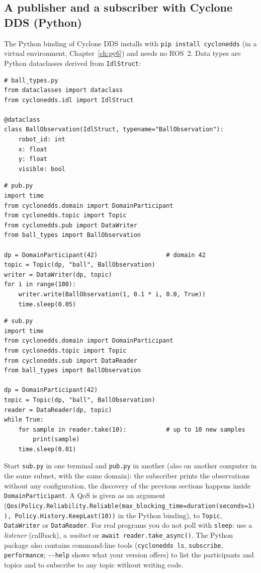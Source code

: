 \subsection*{A publisher and a subscriber with Cyclone DDS (Python)}
The Python binding of Cyclone DDS installs with \verb!pip install cyclonedds! (in a virtual environment, Chapter~\ref{ch:py6}) and needs no ROS~2. Data types are Python dataclasses derived from \verb!IdlStruct!:
\begin{verbatim}
# ball_types.py
from dataclasses import dataclass
from cyclonedds.idl import IdlStruct

@dataclass
class BallObservation(IdlStruct, typename="BallObservation"):
    robot_id: int
    x: float
    y: float
    visible: bool
\end{verbatim}
\begin{verbatim}
# pub.py
import time
from cyclonedds.domain import DomainParticipant
from cyclonedds.topic import Topic
from cyclonedds.pub import DataWriter
from ball_types import BallObservation

dp = DomainParticipant(42)                   # domain 42
topic = Topic(dp, "ball", BallObservation)
writer = DataWriter(dp, topic)
for i in range(100):
    writer.write(BallObservation(1, 0.1 * i, 0.0, True))
    time.sleep(0.05)
\end{verbatim}
\begin{verbatim}
# sub.py
import time
from cyclonedds.domain import DomainParticipant
from cyclonedds.topic import Topic
from cyclonedds.sub import DataReader
from ball_types import BallObservation

dp = DomainParticipant(42)
topic = Topic(dp, "ball", BallObservation)
reader = DataReader(dp, topic)
while True:
    for sample in reader.take(10):           # up to 10 new samples
        print(sample)
    time.sleep(0.01)
\end{verbatim}
Start \verb!sub.py! in one terminal and \verb!pub.py! in another (also on another computer in the same subnet, with the same domain): the subscriber prints the observations without any configuration, the discovery of the previous sections happens inside \verb!DomainParticipant!. A QoS is given as an argument (\verb!Qos(Policy.Reliability.Reliable(max_blocking_time=duration(seconds=1)), Policy.History.KeepLast(10))! in the Python binding), to \verb!Topic!, \verb!DataWriter! or \verb!DataReader!. For real programs you do not poll with \verb!sleep!: use a \emph{listener} (callback), a \emph{waitset} or \verb!await reader.take_async()!. The Python package also contains command-line tools (\verb!cyclonedds ls!, \verb!subscribe!, \verb!performance!; \verb!--help! shows what your version offers) to list the participants and topics and to subscribe to any topic without writing code.

